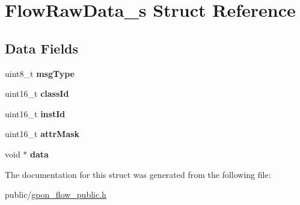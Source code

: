 \hypertarget{structFlowRawData__s}{}\section{Flow\+Raw\+Data\+\_\+s Struct Reference}
\label{structFlowRawData__s}
\subsection*{Data Fields}
\begin{DoxyCompactItemize}
\item 
\mbox{\label{structFlowRawData__s_a955ff3fb71b2d9e7913b7d0d367c5cbb}} 
uint8\+\_\+t {\bfseries msg\+Type}
\item 
\mbox{\label{structFlowRawData__s_af757397fe164eb2724877160652dd359}} 
uint16\+\_\+t {\bfseries class\+Id}
\item 
\mbox{\label{structFlowRawData__s_ad01c329fcaa01b6cddbd27bfbed7b06a}} 
uint16\+\_\+t {\bfseries inst\+Id}
\item 
\mbox{\label{structFlowRawData__s_a6fcf27202f872c8da6c86e4c8250eea4}} 
uint16\+\_\+t {\bfseries attr\+Mask}
\item 
\mbox{\label{structFlowRawData__s_ad1f6f73813858fd34b3eec0e48140e93}} 
void $\ast$ {\bfseries data}
\end{DoxyCompactItemize}


The documentation for this struct was generated from the following file\+:\begin{DoxyCompactItemize}
\item 
public/\hyperlink{gpon__flow__public_8h}{gpon\+\_\+flow\+\_\+public.\+h}\end{DoxyCompactItemize}
